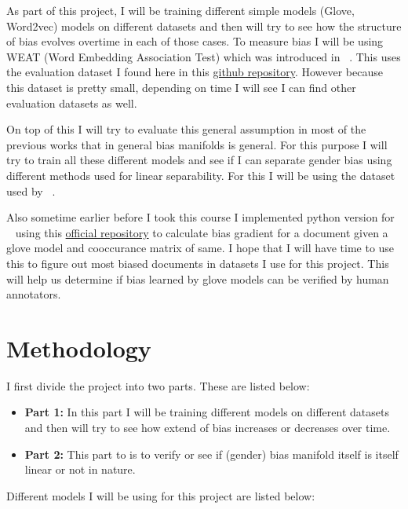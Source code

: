 \documentclass[sigconf,authordraft]{acmart}
\begin{document}
As part of this project, I will be training different simple models (Glove, Word2vec) models on different datasets and then will try to see how the structure of bias evolves overtime in each of those cases. To measure bias I will be using WEAT (Word Embedding Association Test) which was introduced in ~\cite{caliskan_semantics_2017}. This uses the evaluation dataset I found here in this \href{https://github.com/chadaeun/weat_replication/tree/master/weat}{github repository}. However because this dataset is pretty small, depending on time I will see I can find other evaluation datasets as well.

On top of this I will try to evaluate this general assumption in most of the previous works that in general bias manifolds is general. For this purpose I will try to train all these different models and see if I can separate gender bias using different methods used for linear separability. For this I will be using the dataset used by ~\cite{garg_word_2018}.

Also sometime earlier before I took this course I implemented python version for ~\cite{brunet_understanding_2019} using this \href{https://github.com/mebrunet/understanding-bias}{official repository} to calculate bias gradient for a document given a glove model and cooccurance matrix of same. I hope that I will have time to use this to figure out most biased documents in datasets I use for this project. This will help us determine if bias learned by glove models can be verified by human annotators.




\section{Methodology}

I first divide the project into two parts. These are listed below:

\begin{itemize}
    \item \textbf{Part 1:} In this part I will be training different models on different datasets and then will try to see how extend of bias increases or decreases over time.
    \item \textbf{Part 2:} This part to is to verify or see if (gender) bias manifold itself is itself linear or not in nature.

\end{itemize}

Different models I will be using for this project are listed below:
\end{document}
